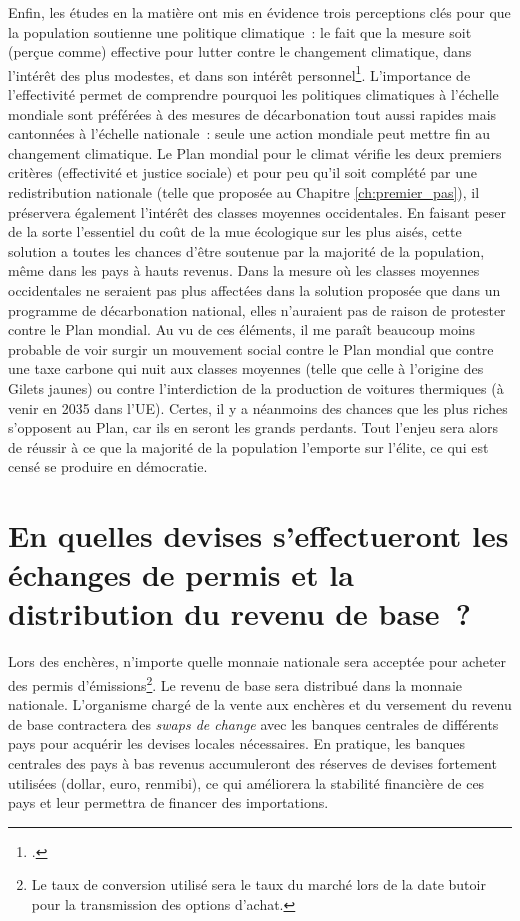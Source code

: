 \documentclass[a5paper,french,openany]{memoir}
\begin{document}
Enfin, les études en la matière ont mis en évidence trois perceptions clés pour que la population soutienne une politique climatique~: le fait que la mesure soit (perçue comme) effective pour lutter contre le changement climatique, dans l'intérêt des plus modestes, et dans son intérêt personnel\footnote{\cite{dechezlepretre_fighting_2022}.}. L'importance de l'effectivité permet de comprendre pourquoi les politiques climatiques à l'échelle mondiale sont préférées à des mesures de décarbonation tout aussi rapides mais cantonnées à l'échelle nationale~: seule une action mondiale peut mettre fin au changement climatique. Le Plan mondial pour le climat vérifie les deux premiers critères (effectivité et justice sociale) et pour peu qu'il soit complété par une redistribution nationale (telle que proposée au Chapitre \ref{ch:premier_pas}), il préservera également l'intérêt des classes moyennes occidentales. En faisant peser de la sorte l'essentiel du coût de la mue écologique sur les plus aisés, cette solution a toutes les chances d'être soutenue par la majorité de la population, même dans les pays à hauts revenus. Dans la mesure où les classes moyennes occidentales ne seraient pas plus affectées dans la solution proposée que dans un programme de décarbonation national, elles n'auraient pas de raison de protester contre le Plan mondial. Au vu de ces éléments, il me paraît beaucoup moins probable de voir surgir un mouvement social contre le Plan mondial que contre une taxe carbone qui nuit aux classes moyennes (telle que celle à l'origine des Gilets jaunes) ou contre l'interdiction de la production de voitures thermiques (à venir en 2035 dans l'UE). Certes, il y a néanmoins des chances que les plus riches s'opposent au Plan, car ils en seront les grands perdants. Tout l'enjeu sera alors de réussir à ce que la majorité de la population l'emporte sur l'élite, ce qui est censé se produire en démocratie.


\section*{\normalsize En quelles devises s'effectueront les échanges de permis et la distribution du revenu de base~?}\label{q:devise}

Lors des enchères, n'importe quelle monnaie nationale sera acceptée pour acheter des permis d'émissions\footnote{Le taux de conversion utilisé sera le taux du marché lors de la date butoir pour la transmission des options d'achat.}. Le revenu de base sera distribué dans la monnaie nationale. L'organisme chargé de la vente aux enchères et du versement du revenu de base contractera des \textit{swaps de change} avec les banques centrales de différents pays pour acquérir les devises locales nécessaires. En pratique, les banques centrales des pays à bas revenus accumuleront des réserves de devises fortement utilisées (dollar, euro, renmibi), ce qui améliorera la stabilité financière de ces pays et leur permettra de financer des importations.
\end{document}
